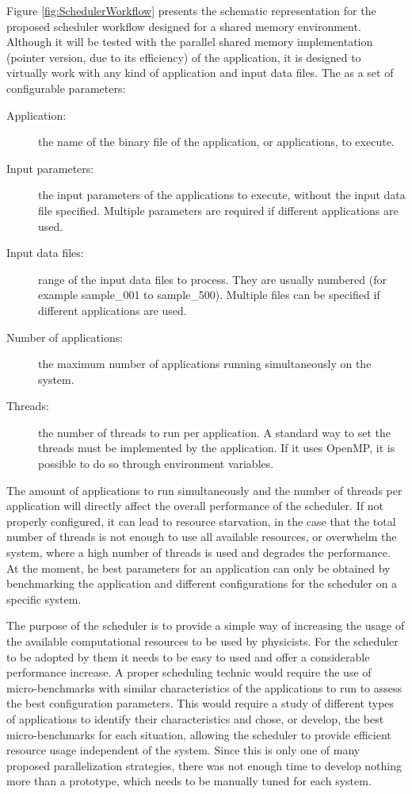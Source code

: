 Figure \ref{fig:SchedulerWorkflow} presents the schematic representation for the proposed scheduler workflow designed for a shared memory environment. Although it will be tested with the parallel shared memory implementation (pointer version, due to its efficiency) of the \tth application, it is designed to virtually work with any kind of application and input data files. The as a set of configurable parameters:

\begin{description}
	\item[Application:] the name of the binary file of the application, or applications, to execute.
	\item[Input parameters:] the input parameters of the applications to execute, without the input data file specified. Multiple parameters are required if different applications are used.
	\item[Input data files:] range of the input data files to process. They are usually numbered (for example sample\_001 to sample\_500). Multiple files can be specified if different applications are used.
	\item[Number of applications:] the maximum number of applications running simultaneously on the system.
	\item[Threads:] the number of threads to run per application. A standard way to set the threads must be implemented by the application. If it uses OpenMP, it is possible to do so through environment variables.
\end{description}

The amount of applications to run simultaneously and the number of threads per application will directly affect the overall performance of the scheduler. If not properly configured, it can lead to resource starvation, in the case that the total number of threads is not enough to use all available resources, or overwhelm the system, where a high number of threads is used and degrades the performance. At the moment, he best parameters for an application can only be obtained by benchmarking the application and different configurations for the scheduler on a specific system.

The purpose of the scheduler is to provide a simple way of increasing the usage of the available computational resources to be used by physicists. For the scheduler to be adopted by them it needs to be easy to used and offer a considerable performance increase. A proper scheduling technic would require the use of micro-benchmarks with similar characteristics of the applications to run to assess the best configuration parameters. This would require a study of different types of applications to identify their characteristics and chose, or develop, the best micro-benchmarks for each situation, allowing the scheduler to provide efficient resource usage independent of the system. Since this is only one of many proposed parallelization strategies, there was not enough time to develop nothing more than a prototype, which needs to be manually tuned for each system.

